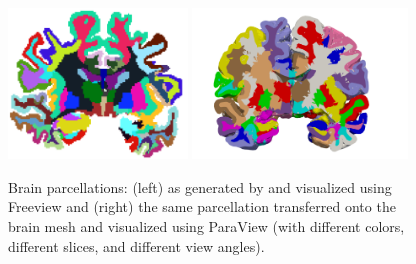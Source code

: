 %
\begin{figure}
\begin{center}
  \hspace{2em}
  \includegraphics[height=4cm]{./graphics/chp4/parcellation-coronalwhiteBG_2.png}
  \includegraphics[height=4cm]{./graphics/chp4/ernie32-parcellation-basic.png}
  \caption{Brain parcellations: (left) as generated by \freesurfer{} and visualized 
   using Freeview and (right) the same parcellation transferred onto the {\fenics} 
   brain mesh and visualized using ParaView (with different colors, different 
   slices, and different view angles).} 
  \label{fig:chp4:freesurfer-parc}
\end{center}
\end{figure}

